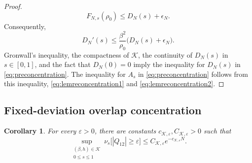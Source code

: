 \documentclass[11pt]{article}
\newtheorem{corollary}[theorem]{Corollary}
\numberwithin{equation}{section}
\newcommand{\1}{\mathbf 1}
\newcommand{\cK}{\mathcal K}
\begin{document}
\begin{proof}
\begin{equation}
 F_{N,s}(\rho_0)
 \le D_N(s)+\epsilon_N.
\end{equation}
Consequently,
\begin{equation}
 D_N'(s)
 \le\frac{\beta^2}{\rho_0}
 \bigl(D_N(s)+\epsilon_N\bigr).
 \label{eq:gronwallDN}
\end{equation}
Gronwall's inequality, the compactness of $\cK$, the continuity of $D_N (s)$ in $s\in [0,1]$, and the fact that $D_N(0)=0$ imply the inequality for $D_N(s)$ in \eqref{eq:preconcentration}.
The inequality for $A_s$ in \eqref{eq:preconcentration} follows from this inequality, \eqref{eq:lemreconcentration1} and \eqref{eq:lemreconcentration2}.
\end{proof}


\subsection{Fixed-deviation overlap concentration}\label{subsec:tails}

\begin{corollary}
\label{cor:tail}
For every $\varepsilon>0$, there are constants
$c_{\cK,\varepsilon},C_{\cK,\varepsilon}>0$ such that
\begin{equation}
 \sup_{\substack{(\beta,h)\in\cK\\0\le s\le1}}
 \nu_s\bigl[|Q_{12}|\ge\varepsilon\bigr]
 \le C_{\cK,\varepsilon}e^{-c_{\cK,\varepsilon}N}.
 \label{eq:tail}
\end{equation}
\end{corollary}
\end{document}
